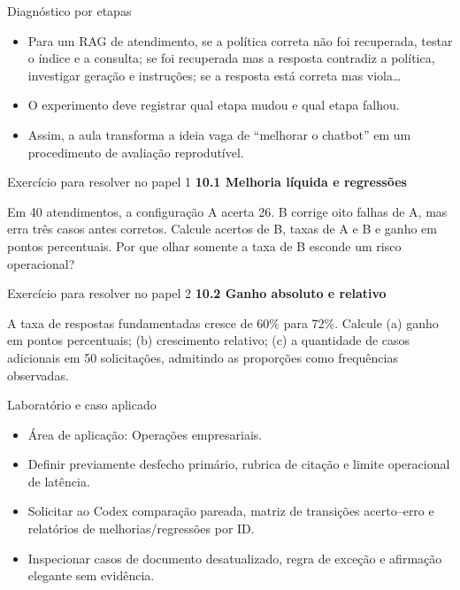 \documentclass[10pt,aspectratio=169]{beamer}
\begin{document}
\begin{frame}[t]{Diagnóstico por etapas}
\small
\begin{itemize}
\item Para um RAG de atendimento, se a política correta não foi recuperada, testar o índice e a consulta; se foi recuperada mas a resposta contradiz a política, investigar geração e instruções; se a resposta está correta mas viola…
\item O experimento deve registrar qual etapa mudou e qual etapa falhou.
\item Assim, a aula transforma a ideia vaga de ``melhorar o chatbot'' em um procedimento de avaliação reprodutível.
\end{itemize}
\end{frame}

\begin{frame}[t]{Exercício para resolver no papel 1}
\small
\small\textbf{10.1 Melhoria líquida e regressões}\par\vspace{4mm}Em 40 atendimentos, a configuração A acerta 26. B corrige oito falhas de A, mas erra três casos antes corretos. Calcule acertos de B, taxas de A e B e ganho em pontos percentuais. Por que olhar somente a taxa de B esconde um risco operacional?
\end{frame}

\begin{frame}[t]{Exercício para resolver no papel 2}
\small
\small\textbf{10.2 Ganho absoluto e relativo}\par\vspace{4mm}A taxa de respostas fundamentadas cresce de 60\% para 72\%. Calcule (a) ganho em pontos percentuais; (b) crescimento relativo; (c) a quantidade de casos adicionais em 50 solicitações, admitindo as proporções como frequências observadas.
\end{frame}

\begin{frame}[t]{Laboratório e caso aplicado}
\small
\begin{itemize}
\item Área de aplicação: Operações empresariais.
\item Definir previamente desfecho primário, rubrica de citação e limite operacional de latência.
\item Solicitar ao Codex comparação pareada, matriz de transições acerto–erro e relatórios de melhorias/regressões por ID.
\item Inspecionar casos de documento desatualizado, regra de exceção e afirmação elegante sem evidência.
\end{itemize}
\end{frame}
\end{document}
